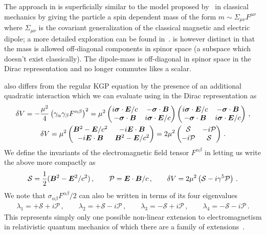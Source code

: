 The approach in  is superficially similar to the model proposed by~\cite{Frenkel:1926zz} in classical mechanics by giving the particle a spin dependent mass of the form $m\sim\Sigma_{\mu\nu}F^{\mu\nu}$ where $\Sigma_{\mu\nu}$ is the covariant generalization of the classical magnetic and electric dipole; a more detailed exploration can be found in~\cite{Formanek:2020ojr}.  is however distinct in that the mass is allowed off-diagonal components in spinor space (a subspace which doesn't exist classically). The dipole-mass  is off-diagonal in spinor space in the Dirac representation and no longer commutes likes a scalar.

 also differs from the regular KGP equation by the presence of an additional quadratic interaction which we can evaluate using  in the Dirac representation as
\begin{gather}
    \label{quad:1} \delta V=-\frac{\mu^{2}}{4}\left(\gamma_{\alpha}\gamma_{\beta}F^{\alpha\beta}\right)^{2}=\mu^{2}
    \begin{pmatrix}
        i\boldsymbol{\sigma}\cdot\boldsymbol{E}/c & -\boldsymbol{\sigma}\cdot\boldsymbol{B} \\
        -\boldsymbol{\sigma}\cdot\boldsymbol{B} & i\boldsymbol{\sigma}\cdot\boldsymbol{E}/c
    \end{pmatrix}
    \begin{pmatrix}
        i\boldsymbol{\sigma}\cdot\boldsymbol{E}/c & -\boldsymbol{\sigma}\cdot\boldsymbol{B} \\
        -\boldsymbol{\sigma}\cdot\boldsymbol{B} & i\boldsymbol{\sigma}\cdot\boldsymbol{E}/c
    \end{pmatrix}\,,\\
    \label{quad:2}
    \delta V = \mu^{2}
    \begin{pmatrix}
        \boldsymbol{B}^{2}-\boldsymbol{E}/c^{2} & -i\boldsymbol{E}\cdot\boldsymbol{B} \\
        -i\boldsymbol{E}\cdot\boldsymbol{B} & \boldsymbol{B}^{2}-\boldsymbol{E}/c^{2}
    \end{pmatrix}=2\mu^{2}
    \begin{pmatrix}
        \mathcal{S} & -i\mathcal{P} \\
        -i\mathcal{P} & \mathcal{S}
    \end{pmatrix}\,.
\end{gather}
We define the invariants of the electromagnetic field tensor $F^{\alpha\beta}$ in   letting us write the above more compactly as
\begin{alignat}{1}
    \label{inv:1} \mathcal{S}=\frac{1}{2}(\boldsymbol{B}^{2}-\boldsymbol{E}^{2}/c^{2})\,,\qquad
    \mathcal{P}=\boldsymbol{E}\cdot\boldsymbol{B}/c\,,\qquad
    \delta V=2\mu^{2}\left(\mathcal{S}-i\gamma^{5}\mathcal{P}\right)\,.
\end{alignat}
We note that $\sigma_{\alpha\beta}F^{\alpha\beta}/2$ can also be written in terms of its four eigenvalues
\begin{align}
    \label{inv:2}
    \lambda_{1}=+\mathcal{S}+i\mathcal{P}\,,\qquad
    \lambda_{2}=+\mathcal{S}-i\mathcal{P}\,,\qquad
    \lambda_{3}=-\mathcal{S}+i\mathcal{P}\,,\qquad
    \lambda_{4}=-\mathcal{S}-i\mathcal{P}\,.
\end{align}
This represents simply only one possible non-linear extension to electromagnetism in relativistic quantum mechanics of which there are a family of extensions~\citep{Foldy:1952a}.

